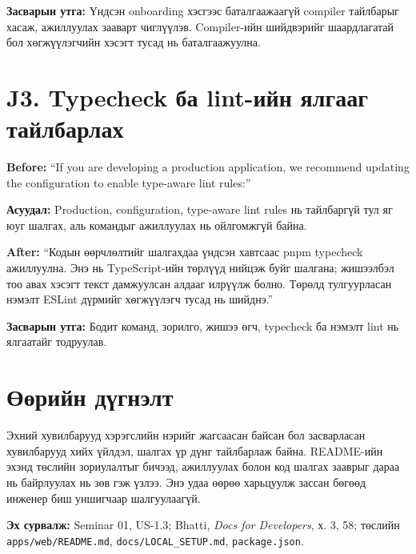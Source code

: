 \documentclass[11pt,a4paper]{article}
\newcommand{\pathref}[1]{\nolinkurl{#1}}
\begin{document}
\textbf{Засварын утга:} Үндсэн onboarding хэсгээс баталгаажаагүй compiler тайлбарыг хасаж, ажиллуулах зааварт чиглүүлэв. Compiler-ийн шийдвэрийг шаардлагатай бол хөгжүүлэгчийн хэсэгт тусад нь баталгаажуулна.
\section{J3. Typecheck ба lint-ийн ялгааг тайлбарлах}
\textbf{Before:} ``If you are developing a production application, we recommend updating the configuration to enable type-aware lint rules:''

\textbf{Асуудал:} Production, configuration, type-aware lint rules нь тайлбаргүй тул яг юуг шалгах, аль командыг ажиллуулах нь ойлгомжгүй байна.

\textbf{After:} ``Кодын өөрчлөлтийг шалгахдаа үндсэн хавтсаас pnpm typecheck ажиллуулна. Энэ нь TypeScript-ийн төрлүүд нийцэж буйг шалгана; жишээлбэл тоо авах хэсэгт текст дамжуулсан алдааг илрүүлж болно. Төрөлд тулгуурласан нэмэлт ESLint дүрмийг хөгжүүлэгч тусад нь шийднэ.''

\textbf{Засварын утга:} Бодит команд, зорилго, жишээ өгч, typecheck ба нэмэлт lint нь ялгаатайг тодруулав.
\section{Өөрийн дүгнэлт}
Эхний хувилбарууд хэрэгслийн нэрийг жагсаасан байсан бол засварласан хувилбарууд хийх үйлдэл, шалгах үр дүнг тайлбарлаж байна. README-ийн эхэнд төслийн зориулалтыг бичээд, ажиллуулах болон код шалгах зааврыг дараа нь байрлуулах нь зөв гэж үзлээ. Энэ удаа өөрөө харьцуулж зассан бөгөөд инженер биш уншигчаар шалгуулаагүй.

\textbf{Эх сурвалж:} Seminar 01, US-1.3; Bhatti, \textit{Docs for Developers}, х. 3, 58; төслийн \pathref{apps/web/README.md}, \pathref{docs/LOCAL_SETUP.md}, \pathref{package.json}.
\end{document}
